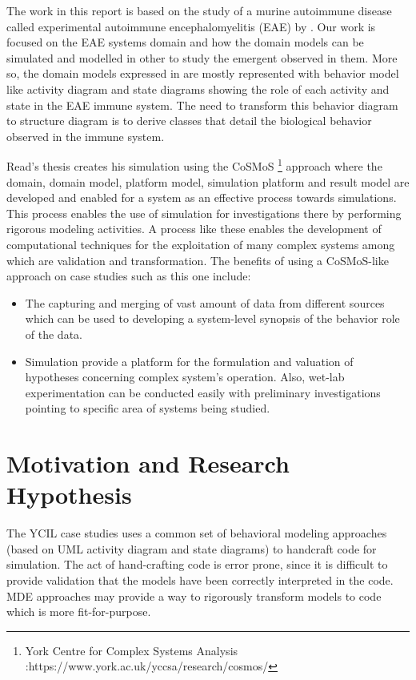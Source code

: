 \documentclass[12pt, a4paper]{report}
\begin{document}
The work in this report is based on the study of a murine autoimmune disease called experimental autoimmune encephalomyelitis (EAE) by \cite{Read2011}. Our work is focused on the EAE systems domain and how the domain models can be simulated and modelled in other to study the emergent observed in them. More so, the domain models expressed in \cite{Read2011} are mostly represented with behavior model like activity diagram and state diagrams showing the role of each activity and state in the EAE immune system. The need to transform this behavior diagram to structure diagram is to derive classes that detail the biological behavior observed in the immune system.

Read's thesis \cite{Read2011} creates his simulation using the CoSMoS \footnote{York Centre for Complex Systems Analysis :https://www.york.ac.uk/yccsa/research/cosmos/} approach where the domain, domain model, platform model, simulation platform and result model are developed and enabled for a system as an effective process towards simulations. This process enables the use of simulation for investigations there by performing rigorous modeling activities. A process like these enables the development of computational techniques for the exploitation of many complex systems among which are validation and transformation. The benefits of using a CoSMoS-like approach on case studies such as this one include: 

\begin{itemize}

\item The capturing and merging of vast amount of data from different sources which can be used to developing a system-level synopsis of the behavior role of the data.

\item Simulation provide a platform for the formulation and valuation of hypotheses concerning complex system’s operation. Also, wet-lab experimentation can be conducted easily with preliminary investigations pointing to specific area of systems being studied.   

\end{itemize}

\section{Motivation and Research Hypothesis}

The YCIL case studies \cite{Read2011, Moyo2014, Richard2014} uses a common set of behavioral modeling approaches (based on UML activity diagram and state diagrams) to handcraft code for simulation. The act of hand-crafting code is error prone, since it is difficult to provide validation that the models have been correctly interpreted in the code. MDE approaches may provide a way to rigorously transform models to code which is more fit-for-purpose. 
\end{document}
